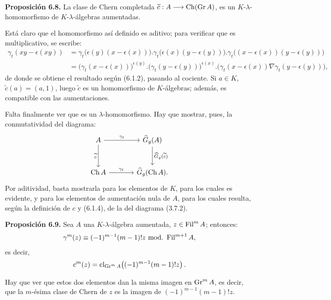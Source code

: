 \textbf{Proposición 6.8.} La clase de Chern completada \(\sisi{c}{\widetilde c}:A\longrightarrow\Ch(\Gr A)\), es un \(K\)-\(\lambda\)-homomorfismo de \(K\)-\(\lambda\)-álgebras aumentadas.

Está claro que el homomorfismo así definido es aditivo; para verificar que es multiplicativo, se escribe:
\[
\begin{aligned}
\gamma_t(xy-\epsilon(xy))
&=\gamma_t\bigl(\epsilon(y)(x-\epsilon(x))\bigr).
  \gamma_t\bigl(\epsilon(x)(y-\epsilon(y))\bigr).
  \gamma_t\bigl((x-\epsilon(x))(y-\epsilon(y))\bigr)\\
&=\bigl(\gamma_t(x-\epsilon(x))\bigr)^{\epsilon(y)}.
  \bigl(\gamma_t(y-\epsilon(y))\bigr)^{\epsilon(x)}.
  \bigl(\gamma_t(x-\epsilon(x))\nabla\gamma_t(y-\epsilon(y))\bigr),
\end{aligned}
\]
de donde se obtiene el resultado según (6.1.2), pasando al cociente. Si \(a\in K\), \(\widetilde c(a)=(a,1)\), luego \(\widetilde c\) es un homomorfismo de \(K\)-álgebras; además, es compatible con las aumentaciones.

Falta finalmente ver que es un \(\lambda\)-homomorfismo. Hay que mostrar, pues, la conmutatividad del diagrama:
\[
\begin{tikzcd}[column sep=large,row sep=large]
A \arrow[r,"\gamma_t"] \arrow[d,"\widetilde c"'] &
\widehat G_g(A) \arrow[d,"\widehat G_g(\widetilde c)"]\\
\Ch A \arrow[r,"\gamma_t"] &
\widehat G_g(\Ch A).
\end{tikzcd}
\]
Por aditividad, basta mostrarla para los elementos de \(K\), para los cuales es evidente, y para los elementos de aumentación nula de \(A\), para los cuales resulta, según la definición de \(c\) y (6.1.4), de la del diagrama (3.7.2).

\textbf{Proposición 6.9.} Sea \(A\) una \(K\)-\(\lambda\)-álgebra aumentada, \(z\in\Fil^mA\); entonces:
\[
  \gamma^m(z)\equiv(-1)^{m-1}(m-1)!z\ \mathrm{mod.}\ \Fil^{m+1}A,
\]
es decir,
\[
  c^m(z)=\cl_{\Gr^mA}\!\left((-1)^{m-1}(m-1)!z\right).
\]

Hay que ver que estos dos elementos dan la misma imagen en \(\Gr^mA\), es decir, que la \(m\)-ésima clase de Chern de \(z\) es la imagen de \((-1)^{m-1}(m-1)!z\).

